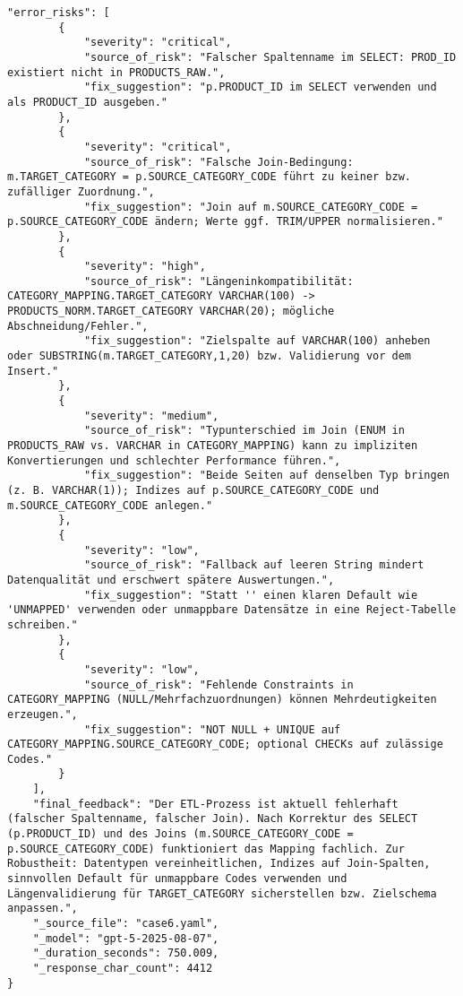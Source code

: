 \begin{lstlisting}[caption={Ausgabe: GPT-5 Anwendungsfall 6 Hauptdurchlauf},label={gpt_case6_prompt1}]
    "error_risks": [
        {
            "severity": "critical",
            "source_of_risk": "Falscher Spaltenname im SELECT: PROD_ID existiert nicht in PRODUCTS_RAW.",
            "fix_suggestion": "p.PRODUCT_ID im SELECT verwenden und als PRODUCT_ID ausgeben."
        },
        {
            "severity": "critical",
            "source_of_risk": "Falsche Join-Bedingung: m.TARGET_CATEGORY = p.SOURCE_CATEGORY_CODE führt zu keiner bzw. zufälliger Zuordnung.",
            "fix_suggestion": "Join auf m.SOURCE_CATEGORY_CODE = p.SOURCE_CATEGORY_CODE ändern; Werte ggf. TRIM/UPPER normalisieren."
        },
        {
            "severity": "high",
            "source_of_risk": "Längeninkompatibilität: CATEGORY_MAPPING.TARGET_CATEGORY VARCHAR(100) -> PRODUCTS_NORM.TARGET_CATEGORY VARCHAR(20); mögliche Abschneidung/Fehler.",
            "fix_suggestion": "Zielspalte auf VARCHAR(100) anheben oder SUBSTRING(m.TARGET_CATEGORY,1,20) bzw. Validierung vor dem Insert."
        },
        {
            "severity": "medium",
            "source_of_risk": "Typunterschied im Join (ENUM in PRODUCTS_RAW vs. VARCHAR in CATEGORY_MAPPING) kann zu impliziten Konvertierungen und schlechter Performance führen.",
            "fix_suggestion": "Beide Seiten auf denselben Typ bringen (z. B. VARCHAR(1)); Indizes auf p.SOURCE_CATEGORY_CODE und m.SOURCE_CATEGORY_CODE anlegen."
        },
        {
            "severity": "low",
            "source_of_risk": "Fallback auf leeren String mindert Datenqualität und erschwert spätere Auswertungen.",
            "fix_suggestion": "Statt '' einen klaren Default wie 'UNMAPPED' verwenden oder unmappbare Datensätze in eine Reject-Tabelle schreiben."
        },
        {
            "severity": "low",
            "source_of_risk": "Fehlende Constraints in CATEGORY_MAPPING (NULL/Mehrfachzuordnungen) können Mehrdeutigkeiten erzeugen.",
            "fix_suggestion": "NOT NULL + UNIQUE auf CATEGORY_MAPPING.SOURCE_CATEGORY_CODE; optional CHECKs auf zulässige Codes."
        }
    ],
    "final_feedback": "Der ETL-Prozess ist aktuell fehlerhaft (falscher Spaltenname, falscher Join). Nach Korrektur des SELECT (p.PRODUCT_ID) und des Joins (m.SOURCE_CATEGORY_CODE = p.SOURCE_CATEGORY_CODE) funktioniert das Mapping fachlich. Zur Robustheit: Datentypen vereinheitlichen, Indizes auf Join-Spalten, sinnvollen Default für unmappbare Codes verwenden und Längenvalidierung für TARGET_CATEGORY sicherstellen bzw. Zielschema anpassen.",
    "_source_file": "case6.yaml",
    "_model": "gpt-5-2025-08-07",
    "_duration_seconds": 750.009,
    "_response_char_count": 4412
}
\end{lstlisting}


